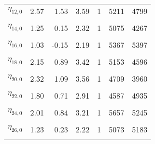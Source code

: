 \begin{longtable}[t]{lrrrrrr}
$\eta_{12, 0}$ & 2.57 & 1.53 & 3.59 & 1 & 5211 & 4799\\
\cellcolor{gray!6}{$\eta_{13, 0}$} & \cellcolor{gray!6}{2.20} & \cellcolor{gray!6}{1.27} & \cellcolor{gray!6}{3.12} & \cellcolor{gray!6}{1} & \cellcolor{gray!6}{4651} & \cellcolor{gray!6}{3864}\\
$\eta_{14, 0}$ & 1.25 & 0.15 & 2.32 & 1 & 5075 & 4267\\
\cellcolor{gray!6}{$\eta_{15, 0}$} & \cellcolor{gray!6}{1.14} & \cellcolor{gray!6}{0.24} & \cellcolor{gray!6}{2.08} & \cellcolor{gray!6}{1} & \cellcolor{gray!6}{5216} & \cellcolor{gray!6}{3867}\\
$\eta_{16, 0}$ & 1.03 & -0.15 & 2.19 & 1 & 5367 & 5397\\
\cellcolor{gray!6}{$\eta_{17, 0}$} & \cellcolor{gray!6}{1.63} & \cellcolor{gray!6}{0.76} & \cellcolor{gray!6}{2.48} & \cellcolor{gray!6}{1} & \cellcolor{gray!6}{4869} & \cellcolor{gray!6}{4784}\\
$\eta_{18, 0}$ & 2.15 & 0.89 & 3.42 & 1 & 5153 & 4596\\
\cellcolor{gray!6}{$\eta_{19, 0}$} & \cellcolor{gray!6}{1.53} & \cellcolor{gray!6}{0.80} & \cellcolor{gray!6}{2.27} & \cellcolor{gray!6}{1} & \cellcolor{gray!6}{5437} & \cellcolor{gray!6}{4798}\\
$\eta_{20, 0}$ & 2.32 & 1.09 & 3.56 & 1 & 4709 & 3960\\
\cellcolor{gray!6}{$\eta_{21, 0}$} & \cellcolor{gray!6}{3.17} & \cellcolor{gray!6}{2.31} & \cellcolor{gray!6}{4.06} & \cellcolor{gray!6}{1} & \cellcolor{gray!6}{4945} & \cellcolor{gray!6}{4942}\\
$\eta_{22, 0}$ & 1.80 & 0.71 & 2.91 & 1 & 4587 & 4935\\
\cellcolor{gray!6}{$\eta_{23, 0}$} & \cellcolor{gray!6}{2.23} & \cellcolor{gray!6}{0.90} & \cellcolor{gray!6}{3.52} & \cellcolor{gray!6}{1} & \cellcolor{gray!6}{5388} & \cellcolor{gray!6}{5085}\\
$\eta_{24, 0}$ & 2.01 & 0.84 & 3.21 & 1 & 5657 & 5245\\
\cellcolor{gray!6}{$\eta_{25, 0}$} & \cellcolor{gray!6}{2.99} & \cellcolor{gray!6}{1.95} & \cellcolor{gray!6}{4.02} & \cellcolor{gray!6}{1} & \cellcolor{gray!6}{5304} & \cellcolor{gray!6}{5342}\\
$\eta_{26, 0}$ & 1.23 & 0.23 & 2.22 & 1 & 5073 & 5183\\
\cellcolor{gray!6}{$\eta_{27, 0}$} & \cellcolor{gray!6}{1.41} & \cellcolor{gray!6}{0.56} & \cellcolor{gray!6}{2.29} & \cellcolor{gray!6}{1} & \cellcolor{gray!6}{5099} & \cellcolor{gray!6}{4685}\\

\end{longtable}
